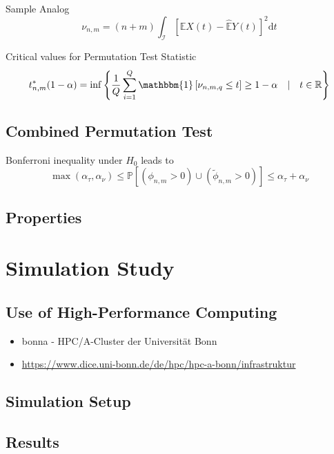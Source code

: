 \documentclass[11pt,twoside,a4paper]{article}
\theoremstyle{assumpstyle} \newtheorem{assumption}{Assumption}
\theoremstyle{assumpstyle} \newtheorem{definition}{Definition}
\begin{document}
		
			Sample Analog
			\begin{equation}
				\nu_{n,m} = (n+m) \int_{\mathcal{I}} \left[\hat{\mathbb{E}}X(t) - \hat{\mathbb{E}}Y(t)\right]^2 \mathrm{d}t
			\end{equation}
		
			Critical values for Permutation Test Statistic
			\begin{equation}
				t^{*}_{n,m}(1-\alpha) = \inf \left\{\frac{1}{Q} \sum_{i = 1}^{Q} \mathbbm{1}\left[\nu_{n,m,q} \leq t\right] \geq 1 - \alpha \quad \vert \quad t \in \mathbb{R}\right\}
			\end{equation}
		
		\subsection{Combined Permutation Test}
			Bonferroni inequality under $H_0$ leads to
			\begin{equation}
				\max(\alpha_{\tau}, \alpha_{\nu}) \leq \mathbb{P}\left[(\phi_{n,m} > 0) \cup (\tilde{\phi}_{n,m} > 0)\right] \leq \alpha_{\tau} + \alpha_{\nu}
			\end{equation}
		
		\subsection{Properties}
		
	\section{Simulation Study}
	
		\subsection{Use of High-Performance Computing}
			\begin{itemize}
				\item bonna - HPC/A-Cluster der Universität Bonn
				\item \url{https://www.dice.uni-bonn.de/de/hpc/hpc-a-bonn/infrastruktur}
			\end{itemize}
	
		\subsection{Simulation Setup}
		
		\subsection{Results}
		
\end{document}
